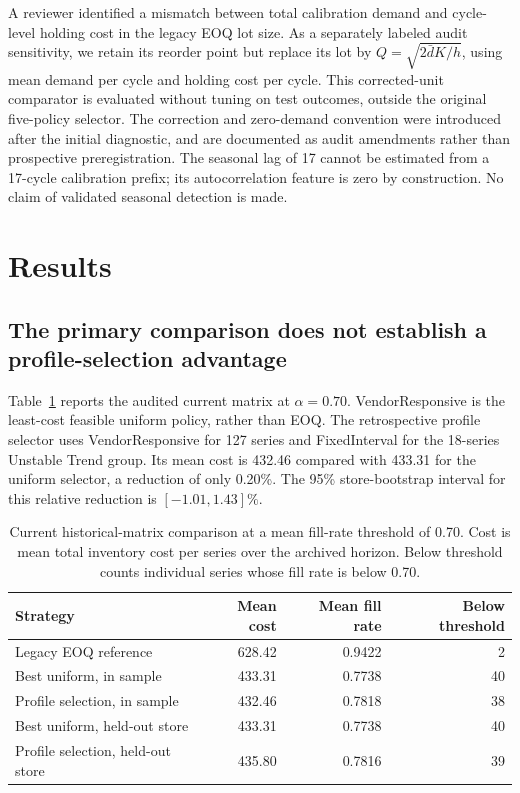 \documentclass[preprint,12pt]{elsarticle}
\begin{document}
A reviewer identified a mismatch between total calibration demand and cycle-level holding cost in the legacy EOQ lot size. As a separately labeled audit sensitivity, we retain its reorder point but replace its lot by $Q=\sqrt{2\bar dK/h}$, using mean demand per cycle and holding cost per cycle. This corrected-unit comparator is evaluated without tuning on test outcomes, outside the original five-policy selector. The correction and zero-demand convention were introduced after the initial diagnostic, and are documented as audit amendments rather than prospective preregistration. The seasonal lag of 17 cannot be estimated from a 17-cycle calibration prefix; its autocorrelation feature is zero by construction. No claim of validated seasonal detection is made.

\section{Results}
\subsection{The primary comparison does not establish a profile-selection advantage}
Table~\ref{tab:primary} reports the audited current matrix at $\alpha=0.70$. VendorResponsive is the least-cost feasible uniform policy, rather than EOQ. The retrospective profile selector uses VendorResponsive for 127 series and FixedInterval for the 18-series Unstable Trend group. Its mean cost is 432.46 compared with 433.31 for the uniform selector, a reduction of only 0.20\%. The 95\% store-bootstrap interval for this relative reduction is $[-1.01,1.43]\%$.

\begin{table}[htbp]
\centering\small
\caption{Current historical-matrix comparison at a mean fill-rate threshold of 0.70. Cost is mean total inventory cost per series over the archived horizon. Below threshold counts individual series whose fill rate is below 0.70.}\label{tab:primary}
\begin{tabular}{lrrr}
\toprule
Strategy & Mean cost & Mean fill rate & Below threshold\\
\midrule
Legacy EOQ reference & 628.42 & 0.9422 & 2\\
Best uniform, in sample & 433.31 & 0.7738 & 40\\
Profile selection, in sample & 432.46 & 0.7818 & 38\\
Best uniform, held-out store & 433.31 & 0.7738 & 40\\
Profile selection, held-out store & 435.80 & 0.7816 & 39\\
\bottomrule
\end{tabular}
\end{table}
\end{document}
